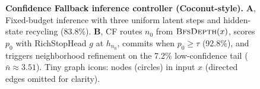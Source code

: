 \begin{figure}[!t]
{\begin{tikzpicture}
\end{tikzpicture}%
}
\vspace{-2mm}
\caption{\textbf{Confidence Fallback inference controller (Coconut-style).} \textbf{A}, Fixed-budget inference with three uniform latent steps and hidden-state recycling (83.8\%). \textbf{B}, CF routes $n_0$ from $\textsc{BfsDepth}(x)$, scores $p_0$ with RichStopHead $g$ at $h_{n_0}$, commits when $p_0\ge\tau$ (92.8\%), and triggers neighborhood refinement on the 7.2\% low-confidence tail ($\bar{n}\approx 3.51$). Tiny graph icons: nodes (circles) in input $x$ (directed edges omitted for clarity).}
\label{fig:flow}
\end{figure}
